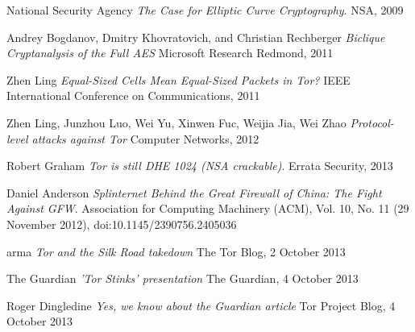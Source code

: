\documentclass[journal]{IEEEtran}
\begin{document}
\begin{thebibliography}{9}
  National Security Agency
  \emph{The Case for Elliptic Curve Cryptography}.
  NSA, 2009

  Andrey Bogdanov, Dmitry Khovratovich, and Christian Rechberger
  \emph{Biclique Cryptanalysis of the Full AES}
  Microsoft Research Redmond, 2011

  Zhen Ling
  \emph{Equal-Sized Cells Mean Equal-Sized Packets in Tor?}
  IEEE International Conference on Communications, 2011

  Zhen Ling, Junzhou Luo, Wei Yu, Xinwen Fuc, Weijia Jia, Wei Zhao
  \emph{Protocol-level attacks against Tor}
  Computer Networks, 2012

  Robert Graham
  \emph{Tor is still DHE 1024 (NSA crackable)}.
  Errata Security, 2013

  Daniel Anderson
  \emph{Splinternet Behind the Great Firewall of China: The Fight Against GFW}.
  Association for Computing Machinery (ACM), Vol. 10, No. 11 (29 November 2012), doi:10.1145/2390756.2405036

  arma
  \emph{Tor and the Silk Road takedown}
  The Tor Blog, 2 October 2013

  The Guardian
  \emph{'Tor Stinks' presentation}
  The Guardian, 4 October 2013

  Roger Dingledine
  \emph{Yes, we know about the Guardian article}
  Tor Project Blog, 4 October 2013

\end{thebibliography}
\end{document}
